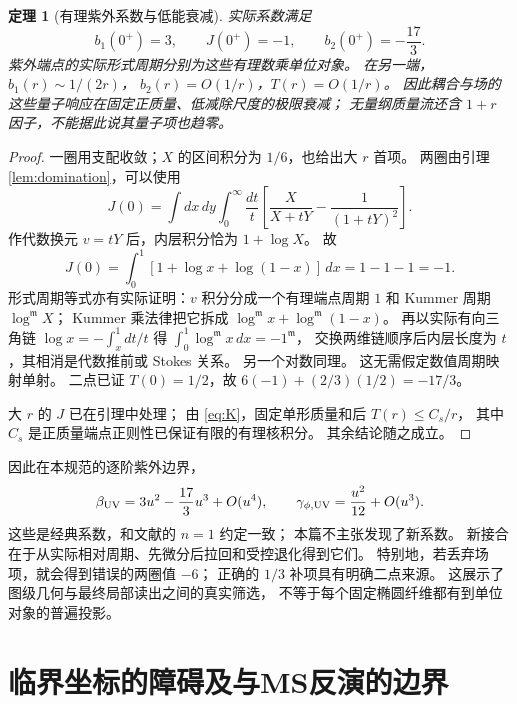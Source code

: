 \documentclass[11pt,a4paper]{ctexart}
\theoremstyle{cnplain}
\newtheorem{theorem}{定理}[section]
\theoremstyle{remark}\newtheorem{remark}[theorem]{注}
\begin{document}
\begin{theorem}[有理紫外系数与低能衰减]\label{thm:UV}
实际系数满足
\begin{equation}\label{eq:UV}
 b_1(0^+)=3,\qquad J(0^+)=-1,\qquad
 b_2(0^+)=-\frac{17}{3}.
\end{equation}
紫外端点的实际形式周期分别为这些有理数乘单位对象。
在另一端，$b_1(r)\sim1/(2r)$，
$b_2(r)=O(1/r)$，$T(r)=O(1/r)$。
因此耦合与场的这些量子响应在固定正质量、低减除尺度的极限衰减；
无量纲质量流还含 $1+r$ 因子，不能据此说其量子项也趋零。
\end{theorem}
\begin{proof}
一圈用支配收敛；$X$ 的区间积分为 $1/6$，也给出大 $r$ 首项。
两圈由引理\ref{lem:domination}，可以使用
\begin{equation}\label{eq:massless}
 J(0)=\int dx\,dy\int_0^\infty\frac{dt}{t}
       \left[\frac{X}{X+tY}-\frac1{(1+tY)^2}\right].
\end{equation}
作代数换元 $v=tY$ 后，内层积分恰为 $1+\log X$。
故
\[
 J(0)=\int_0^1[1+\log x+\log(1-x)]\,dx=1-1-1=-1.
\]
形式周期等式亦有实际证明：$v$ 积分分成一个有理端点周期 $1$
和 Kummer 周期 $\log^{\mathfrak m}X$；
Kummer 乘法律把它拆成 $\log^{\mathfrak m}x+\log^{\mathfrak m}(1-x)$。
再以实际有向三角链
$\log x=-\int_x^1dt/t$ 得
$\int_0^1\log^{\mathfrak m}x\,dx=-1^{\mathfrak m}$，
交换两维链顺序后内层长度为 $t$，其相消是代数推前或 Stokes 关系。
另一个对数同理。
这无需假定数值周期映射单射。
二点已证 $T(0)=1/2$，故 $6(-1)+(2/3)(1/2)=-17/3$。

大 $r$ 的 $J$ 已在引理中处理；
由 \eqref{eq:K}，固定单形质量和后
$T(r)\leq C_s/r$，
其中 $C_s$ 是正质量端点正则性已保证有限的有理核积分。
其余结论随之成立。
\end{proof}

因此在本规范的逐阶紫外边界，
\begin{equation}\label{eq:classical}
 \beta_{\rm UV}=3u^2-\frac{17}{3}u^3+O(u^4),
 \qquad \gamma_{\phi,\rm UV}=\frac{u^2}{12}+O(u^3).
\end{equation}
这些是经典系数，和文献\cite[第II节及式(19)]{KP}的 $n=1$ 约定一致；
本篇不主张发现了新系数。
新接合在于从实际相对周期、先微分后拉回和受控退化得到它们。
特别地，若丢弃场项，就会得到错误的两圈值 $-6$；
正确的 $1/3$ 补项具有明确二点来源。
这展示了图级几何与最终局部读出之间的真实筛选，
不等于每个固定椭圆纤维都有到单位对象的普遍投影。

\section{临界坐标的障碍及与MS反演的边界}\label{sec:critical}
\end{document}
